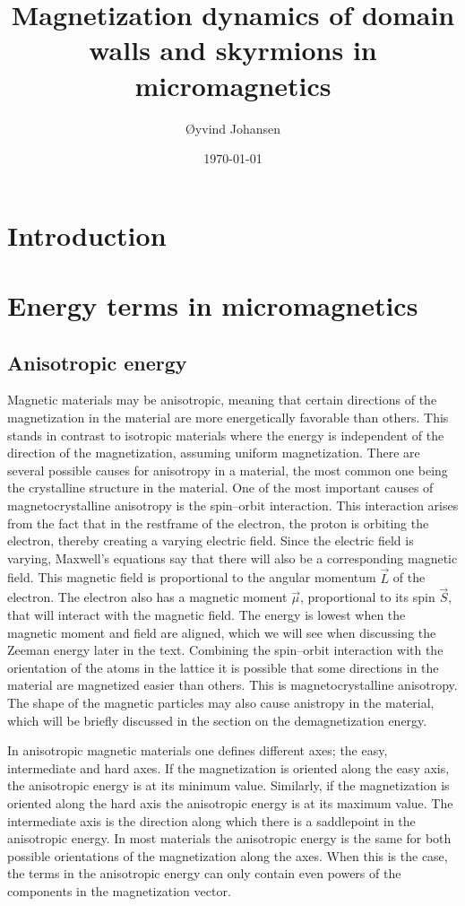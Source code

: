 \documentclass[1p]{elsarticle}		%
\numberwithin{equation}{section}
\begin{document}
\title{Magnetization dynamics of domain walls and skyrmions in micromagnetics}
\author{\O yvind Johansen}
\date{\today}

\maketitle
\tableofcontents

\section{Introduction}

\section{Energy terms in micromagnetics}
\subsection{Anisotropic energy}
Magnetic materials may be anisotropic, meaning that certain directions of the magnetization in the material are more energetically favorable than others. This stands in contrast to isotropic materials where the energy is independent of the direction of the magnetization, assuming uniform magnetization. There are several possible causes for anisotropy in a material, the most common one being the crystalline structure in the material. One of the most important causes of magnetocrystalline anisotropy is the spin--orbit interaction. This interaction arises from the fact that in the restframe of the electron, the proton is orbiting the electron, thereby creating a varying electric field. Since the electric field is varying, Maxwell's equations say that there will also be a corresponding magnetic field. This magnetic field is proportional to the angular momentum $\vec{L}$ of the electron. The electron also has a magnetic moment $\vec{\mu}$, proportional to its spin $\vec{S}$, that will interact with the magnetic field. The energy is lowest when the magnetic moment and field are aligned, which we will see when discussing the Zeeman energy later in the text. Combining the spin--orbit interaction with the orientation of the atoms in the lattice it is possible that some directions in the material are magnetized easier than others. This is magnetocrystalline anisotropy. The shape of the magnetic particles may also cause anistropy in the material, which will be briefly discussed in the section on the demagnetization energy. 

In anisotropic magnetic materials one defines different axes; the easy, intermediate and hard axes. If the magnetization is oriented along the easy axis, the anisotropic energy is at its minimum value. Similarly, if the magnetization is oriented along the hard axis the anisotropic energy is at its maximum value. The intermediate axis is the direction along which there is a saddlepoint in the anisotropic energy. In most materials the anisotropic energy is the same for both possible orientations of the magnetization along the axes. When this is the case, the terms in the anisotropic energy can only contain even powers of the components in the magnetization vector.
\end{document}
